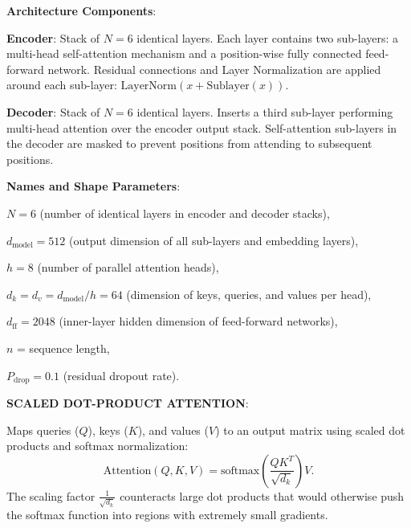 \begin{dashlist}
    \item \textbf{Architecture Components}:
    \begin{dashlist}
        \item \textbf{Encoder}: Stack of $N = 6$ identical layers. Each layer contains two sub-layers: a multi-head self-attention mechanism and a position-wise fully connected feed-forward network. Residual connections and Layer Normalization are applied around each sub-layer: $\text{LayerNorm}(x + \text{Sublayer}(x))$.
        \item \textbf{Decoder}: Stack of $N = 6$ identical layers. Inserts a third sub-layer performing multi-head attention over the encoder output stack. Self-attention sub-layers in the decoder are masked to prevent positions from attending to subsequent positions.
    \end{dashlist}
    
    \item \textbf{Names and Shape Parameters}:
    \begin{dashlist}
        \item $N = 6$ (number of identical layers in encoder and decoder stacks),
        \item $d_{\text{model}} = 512$ (output dimension of all sub-layers and embedding layers),
        \item $h = 8$ (number of parallel attention heads),
        \item $d_k = d_v = d_{\text{model}} / h = 64$ (dimension of keys, queries, and values per head),
        \item $d_{\text{ff}} = 2048$ (inner-layer hidden dimension of feed-forward networks),
        \item $n$ = sequence length,
        \item $P_{\text{drop}} = 0.1$ (residual dropout rate).
    \end{dashlist}

    \item \textbf{SCALED DOT-PRODUCT ATTENTION}: 
    
    Maps queries ($Q$), keys ($K$), and values ($V$) to an output matrix using scaled dot products and softmax normalization:
    \[
    \text{Attention}(Q, K, V) = \text{softmax}\left(\frac{Q K^T}{\sqrt{d_k}}\right) V .
    \]
    The scaling factor $\frac{1}{\sqrt{d_k}}$ counteracts large dot products that would otherwise push the softmax function into regions with extremely small gradients.


\end{dashlist}
